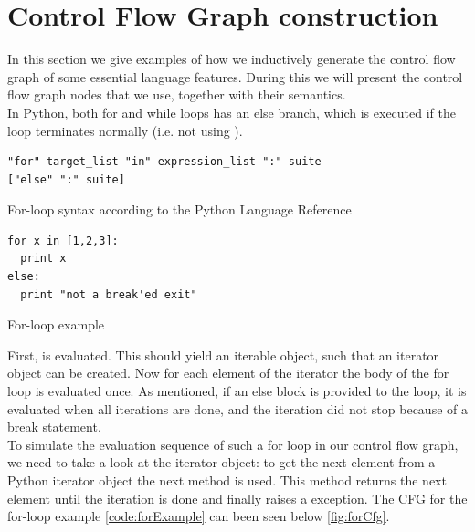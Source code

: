 \chapter{Control Flow Graph construction}

In this section we give examples of how we inductively generate the control flow graph of some essential language features. During this we will present the control flow graph nodes that we use, together with their semantics. \\
In Python, both for and while loops has an else branch, which is executed if the loop terminates normally (i.e. not using ).

\begin{listing}[H]
	\begin{verbatim}
"for" target_list "in" expression_list ":" suite 
["else" ":" suite]
	\end{verbatim}
	\caption{For-loop syntax according to the Python Language Reference}\label{code:forSyntax}
\end{listing}

\begin{listing}[H]
	\begin{verbatim}
for x in [1,2,3]:
  print x
else:
  print "not a break'ed exit"
	\end{verbatim}
	\caption{For-loop example}\label{code:forExample}
\end{listing}

First,  is evaluated. This should yield an iterable object, such that an iterator object can be created. Now for each element of the iterator the body of the for loop is evaluated once. As mentioned, if an else block is provided to the loop, it is evaluated when all iterations are done, and the iteration did not stop because of a break statement. \\
To simulate the evaluation sequence of such a for loop in our control flow graph, we need to take a look at the iterator object: to get the next element from a Python iterator object the next method is used. This method returns the next element until the iteration is done and finally raises a  exception. The CFG for the for-loop example \ref{code:forExample} can been seen below \ref{fig:forCfg}.

